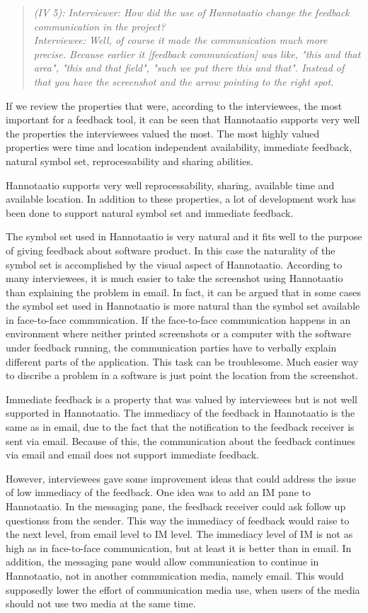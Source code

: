 \documentclass[english,12pt,a4paper,pdftex]{article}
\newcommand{\q}[2]{
\begin{quote}
\emph{(IV #1): #2}
\end{quote}}
\begin{document}
\q{5}{Interviewer: How did the use of Hannotaatio change the feedback communication in the project? \\ Interviewee: Well, of course it made the communication much more precise. Because earlier it [feedback communication] was like, "this and that area", "this and that field", "such we put there this and that". Instead of that you have the screenshot and the arrow pointing to the right spot.}

If we review the properties that were, according to the interviewees, the most important for a feedback tool, it can be seen that Hannotaatio supports very well the properties the interviewees valued the most. The most highly valued properties were time and location independent availability, immediate feedback, natural symbol set, reprocessability and sharing abilities. 

Hannotaatio supports very well reprocessability, sharing, available time and available location. In addition to these properties, a lot of development work has been done to support natural symbol set and immediate feedback. 

The symbol set used in Hannotaatio is very natural and it fits well to the purpose of giving feedback about software product. In this case the naturality of the symbol set is accomplished by the visual aspect of Hannotaatio. According to many interviewees, it is much easier to take the screenshot using Hannotaatio than explaining the problem in email. In fact, it can be argued that in some cases the symbol set used in Hannotaatio is more natural than the symbol set available in face-to-face communication. If the face-to-face communication happens in an environment where neither printed screenshots or a computer with the software under feedback running, the communication parties have to verbally explain different parts of the application. This task can be troublesome. Much easier way to discribe a problem in a software is just point the location from the screenshot.

Immediate feedback is a property that was valued by interviewees but is not well supported in Hannotaatio. The immediacy of the feedback in Hannotaatio is the same as in email, due to the fact that the notification to the feedback receiver is sent via email. Because of this, the communication about the feedback continues via email and email does not support immediate feedback.

However, interviewees gave some improvement ideas that could address the issue of low immediacy of the feedback. One idea was to add an \ac{IM} pane to Hannotaatio. In the messaging pane, the feedback receiver could ask follow up questionss from the sender. This way the immediacy of feedback would raise to the next level, from email level to \ac{IM} level. The immediacy level of \ac{IM} is not as high as in face-to-face communication, but at least it is better than in email. In addition, the messaging pane would allow communication to continue in Hannotaatio, not in another communication media, namely email. This would supposedly lower the effort of communication media use, when users of the media should not use two media at the same time.
\end{document}

